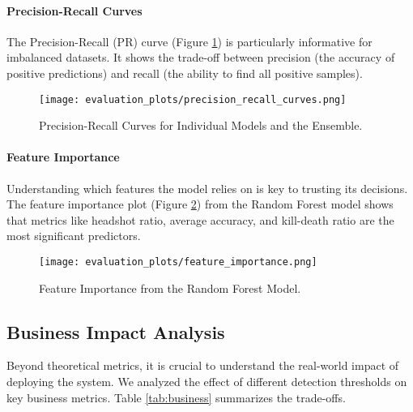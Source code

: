 \documentclass{article}
\begin{document}
\paragraph{Precision-Recall Curves} The Precision-Recall (PR) curve (Figure \ref{fig:pr}) is particularly informative for imbalanced datasets. It shows the trade-off between precision (the accuracy of positive predictions) and recall (the ability to find all positive samples).

\begin{figure}[H]
    \centering
    \texttt{[image: evaluation\_plots/precision\_recall\_curves.png]}
    \caption{Precision-Recall Curves for Individual Models and the Ensemble.}
    \label{fig:pr}
\end{figure}

\paragraph{Feature Importance} Understanding which features the model relies on is key to trusting its decisions. The feature importance plot (Figure \ref{fig:importance}) from the Random Forest model shows that metrics like headshot ratio, average accuracy, and kill-death ratio are the most significant predictors.

\begin{figure}[H]
    \centering
    \texttt{[image: evaluation\_plots/feature\_importance.png]}
    \caption{Feature Importance from the Random Forest Model.}
    \label{fig:importance}
\end{figure}

\subsection{Business Impact Analysis}
Beyond theoretical metrics, it is crucial to understand the real-world impact of deploying the system. We analyzed the effect of different detection thresholds on key business metrics. Table \ref{tab:business} summarizes the trade-offs.
\end{document}
